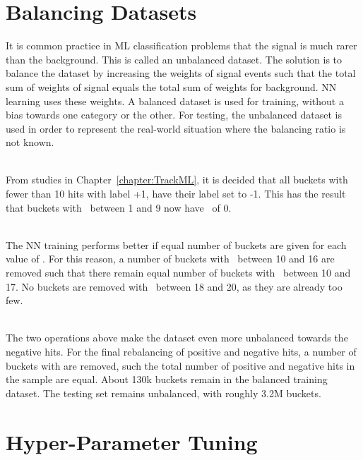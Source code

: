 \section{Balancing Datasets}
\label{sec:BalancingDatasets}

It is common practice in ML classification problems that the signal is much rarer than the background. This is called an unbalanced dataset. The solution is to balance the dataset by increasing the weights of signal events such that the total sum of weights of signal equals the total sum of weights for background. NN learning uses these weights. A balanced dataset is used for training, without a bias towards one category or the other. For testing, the unbalanced dataset is used in order to represent the real-world situation where the balancing ratio is not known.

\ \\From studies in Chapter~\ref{chapter:TrackML}, it is decided that all buckets with fewer than 10 hits with label +1, have their label set to -1. This has the result that buckets with \nbPositiveHit~between 1 and 9 now have \nbPositiveHit~of 0. 

\ \\The NN training performs better if equal number of buckets are given for each value of \nbPositiveHit. For this reason, a number of buckets with \nbPositiveHit~between 10 and 16 are removed such that there remain equal number of buckets with \nbPositiveHit~between 10 and 17. No buckets are removed with \nbPositiveHit~between 18 and 20, as they are already too few.

\ \\The two operations above make the dataset even more unbalanced towards the negative hits. For the final rebalancing of positive and negative hits, a number of buckets with  are removed, such the total number of positive and negative hits in the sample are equal. About 130k buckets remain in the balanced training dataset. The testing set remains unbalanced, with roughly 3.2M buckets.

\section{Hyper-Parameter Tuning}
\label{sec:HyperparameterTuning}

